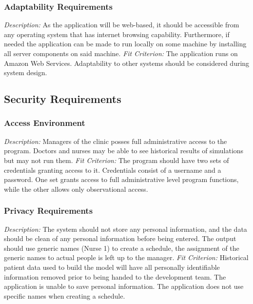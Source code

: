 \documentclass[12pt, titlepage]{article}
\begin{document}
\subsubsection{Adaptability Requirements}
\textit{Description:}\newline
As the application will be web-based, it should be accessible from any operating system that has internet browsing capability. Furthermore, if needed the application can be made to run locally on some machine by installing all server components on said machine.
\newline \newline 
\textit{Fit Criterion:}\newline 
The application runs on Amazon Web Services. Adaptability to other systems should be considered during system design.

\subsection{Security Requirements}
\subsubsection{Access Environment}
\textit{Description:}\newline
Managers of the clinic posses full administrative access to the program. Doctors and nurses may be able to see historical results of simulations but may not run them.
\newline \newline 
\textit{Fit Criterion:}\newline 
The program should have two sets of credentials granting access to it. Credentials consist of a username and a password. One set grants access to full administrative level program functions, while the other allows only observational access. 

\subsubsection{Privacy Requirements}
\textit{Description:}\newline
The system should not store any personal information, and the data should be clean of any personal information before being entered. The output should use generic names (Nurse 1) to create a schedule, the assignment of the generic names to actual people is left up to the manager.
\newline \newline 
\textit{Fit Criterion:}\newline 
Historical patient data used to build the model will have all personally identifiable information removed prior to being handed to the development team. The application is unable to save personal information. The application does not use specific names when creating a schedule.
\end{document}
